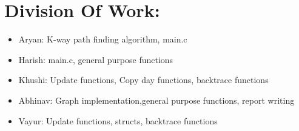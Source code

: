 \documentclass{article}
\begin{document}
\section{Division Of Work:}
\begin{itemize}
\item Aryan: K-way path finding algorithm, main.c
\item Harish: main.c, general purpose functions
\item Khushi: Update functions, Copy day functions, backtrace functions
\item Abhinav: Graph implementation,general purpose functions, report writing
\item Vayur: Update functions, structs, backtrace functions


\end{itemize}
\end{document}
